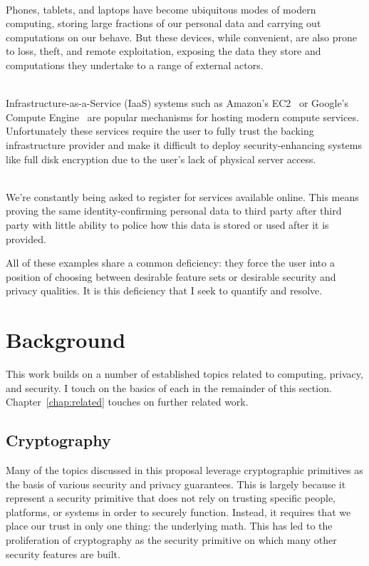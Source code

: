 \begin{packed_desc}
\item[Mobile Computing Devices] \hfill \\ Phones, tablets, and laptops
  have become ubiquitous modes of modern computing, storing large
  fractions of our personal data and carrying out computations on our
  behave. But these devices, while convenient, are also prone to loss,
  theft, and remote exploitation, exposing the data they store and
  computations they undertake to a range of external actors.
\item[Cloud Computing Infrastructure] \hfill
  \\ Infrastructure-as-a-Service (IaaS) systems such as Amazon's
  EC2~\cite{amazon-ec2} or Google's Compute
  Engine~\cite{google-compute} are popular mechanisms for hosting
  modern compute services. Unfortunately these services require the
  user to fully trust the backing infrastructure provider and make it
  difficult to deploy security-enhancing systems like full disk
  encryption due to the user's lack of physical server access.
\item[User Account Registration] \hfill \\ We're constantly being asked to
  register for services available online. This means proving the same
  identity-confirming personal data to third party after third party
  with little ability to police how this data is stored or used after
  it is provided.
\end{packed_desc}

All of these examples share a common deficiency: they force the user
into a position of choosing between desirable feature sets or desirable
security and privacy qualities. It is this deficiency that I seek to
quantify and resolve.

\section{Background}

This work builds on a number of established topics related to
computing, privacy, and security. I touch on the basics of each in the
remainder of this section. Chapter~\ref{chap:related} touches on
further related work.

\subsection{Cryptography}

Many of the topics discussed in this proposal leverage cryptographic
primitives as the basis of various security and privacy
guarantees. This is largely because it represent a security primitive
that does not rely on trusting specific people, platforms, or systems
in order to securely function. Instead, it requires that we place our
trust in only one thing: the underlying math. This has led to the
proliferation of cryptography as the security primitive on which many
other security features are built.

